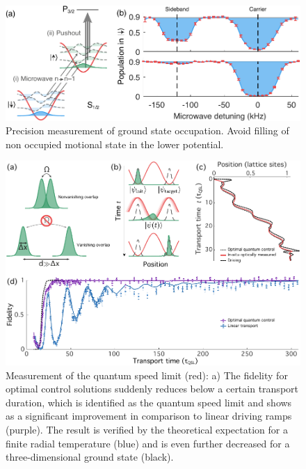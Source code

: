 \documentclass[aps,pra,reprint,a4paper,nofootinbib,superscriptaddress,numbers,longbibliography,showpacs,showkeys,floatfix]{revtex4-1}
\begin{document}
\begin{figure}
	\centering
	\includegraphics[width=\textwidth]{figure2.pdf}
	\caption[]{Precision measurement of ground state occupation. Avoid filling of non occupied motional state in the lower potential.}
	\label{Fig:BelmechriTechnique}
\end{figure}

\begin{figure}
	\centering
	\includegraphics[width=\textwidth]{figure3.pdf}
	\caption[]{Measurement of the quantum speed limit (red): a) The fidelity for optimal control solutions suddenly reduces below a certain transport duration, which is identified as the quantum speed limit and shows as a significant improvement in comparison to linear driving ramps (purple). The result is verified by the theoretical expectation for a finite radial temperature (blue) and is even further decreased for a three-dimensional ground state (black).}
	\label{Fig:QSL_measurement}
\end{figure}
\end{document}
